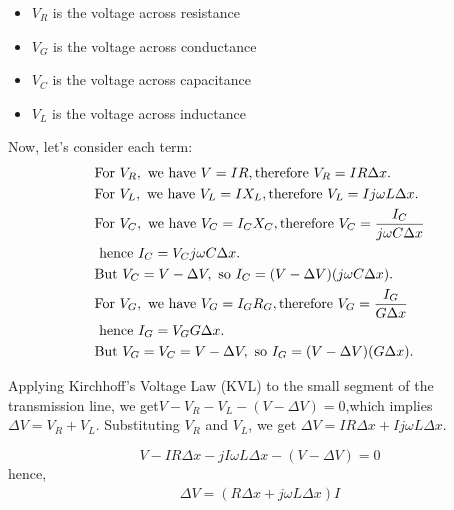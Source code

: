 \begin{itemize}
	\item \(V_{R}\) is the voltage across resistance
	\item \(V_{G}\) is the voltage across conductance
	\item \(V_{C}\) is the voltage across capacitance
	\item \(V_{L}\) is the voltage across inductance
\end{itemize}

Now, let's consider each term:
\begin{align*}
	&\text{For } V_{R}, \text{ we have } V = IR, \text{ 
		\newline
		therefore } V_{R} = IR \Delta x.\\
	&\text{For } V_{L}, \text{ we have } V_{L} = IX_{L}, \text{ 
		\newline therefore } V_{L} = Ij\omega L \Delta x.\\
	&\text{For } V_{C}, \text{ we have } V_{C} = I_{C}X_{C}, \text{ 
		\newline therefore } V_{C} = \frac{I_{C}}{j\omega C \Delta x}\\
		\newline &\text{ hence } I_{C} = V_{C}j\omega C \Delta x.\\
	&\text{But } V_{C} = V - \Delta V, \text{ so } I_{C} = (V - \Delta V)(j\omega C \Delta x).\\
	&\text{For } V_{G}, \text{ we have } V_{G} = I_{G}R_{G}, \text{ 
		\newline therefore } V_{G} = \frac{I_{G}}{G \Delta x}\\
		\newline &\text{ hence } I_{G} = V_{G}G \Delta x.\\
	&\text{But } V_{G} = V_{C} = V - \Delta V, \text{ so } I_{G} = (V - \Delta V)(G \Delta x).
\end{align*}



Applying Kirchhoff's Voltage Law (KVL) to the small segment of the transmission line, we get\newline \(V - V_{R} - V_{L} - (V - \Delta V) = 0\),\newline which implies \(\Delta V = V_{R} + V_{L}\). Substituting \(V_{R}\) and \(V_{L}\), we get \(\Delta V = IR \Delta x + Ij\omega L \Delta x\).

\begin{dmath*}
V  - IR\Delta x - jI\omega L\Delta x - (V - \Delta V) = 0
\end{dmath*}
hence,
\begin{align}  
\Delta V = (R \Delta x + j\omega L\Delta x)I
\label{eqn:voltage}
\end{align}

